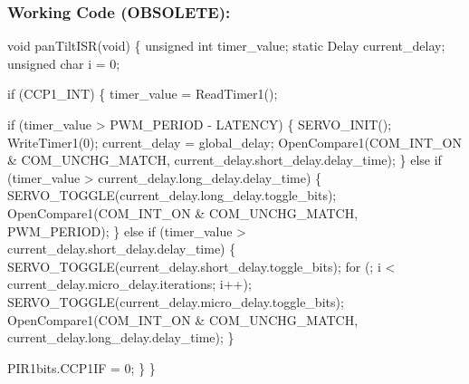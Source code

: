 \documentclass[]{report}
\begin{document}
\subsubsection{Working Code (OBSOLETE):}
void panTiltISR(void)\newline
\{ \newline
	unsigned int timer\_value;\newline
	static Delay current\_delay;\newline
	unsigned char i = 0;\newline
	
	if (CCP1\_INT)\newline
	\{\newline
		timer\_value = ReadTimer1();\newline
		
		if (timer\_value > PWM\_PERIOD - LATENCY)\newline
		\{\newline
			SERVO\_INIT();\newline
			WriteTimer1(0);\newline
			current\_delay = global\_delay;\newline
			OpenCompare1(COM\_INT\_ON \& COM\_UNCHG\_MATCH, current\_delay.short\_delay.delay\_time);\newline
		\}\newline
		else if (timer\_value > current\_delay.long\_delay.delay\_time)\newline
		\{\newline
			SERVO\_TOGGLE(current\_delay.long\_delay.toggle\_bits);\newline
			OpenCompare1(COM\_INT\_ON \& COM\_UNCHG\_MATCH, PWM\_PERIOD); \newline
		\}\newline
		else if (timer\_value > current\_delay.short\_delay.delay\_time)\newline
		\{\newline
			SERVO\_TOGGLE(current\_delay.short\_delay.toggle\_bits);\newline
			for (; i < current\_delay.micro\_delay.iterations; i++);\newline
			SERVO\_TOGGLE(current\_delay.micro\_delay.toggle\_bits);\newline
			OpenCompare1(COM\_INT\_ON \& COM\_UNCHG\_MATCH, current\_delay.long\_delay.delay\_time);\newline
		\}\newline
		
		PIR1bits.CCP1IF = 0;\newline
	\}\newline
\}\newline
\end{document}
